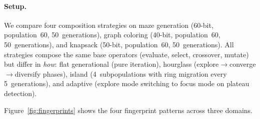 \documentclass[dvipsnames,format=sigconf,anonymous=true,review=true]{acmart}
\begin{document}
\paragraph{Setup.}
\label{sec:fingerprint-setup}
We compare four composition strategies on maze generation (60-bit, population~60, 50~generations), graph coloring (40-bit, population~60, 50~generations), and knapsack (50-bit, population~60, 50~generations). All strategies compose the same base operators (evaluate, select, crossover, mutate) but differ in \emph{how}: flat generational (pure iteration), hourglass (explore$\to$converge$\to$diversify phases), island (4~subpopulations with ring migration every 5~generations), and adaptive (explore mode switching to focus mode on plateau detection).

Figure~\ref{fig:fingerprints} shows the four fingerprint patterns across three domains.
\end{document}
